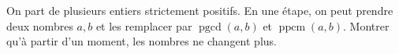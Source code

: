 On part de plusieurs entiers strictement positifs. En une étape, on peut prendre deux nombres $a, b$ et les remplacer par $\operatorname{pgcd}(a, b)$ et $\operatorname{ppcm}(a, b)$. Montrer qu'à partir d'un moment, les nombres ne changent plus.

